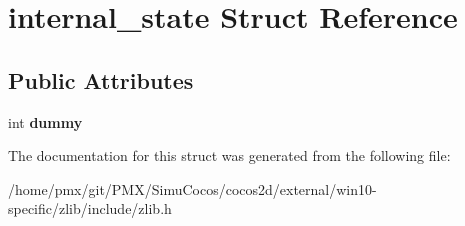 \hypertarget{structinternal__state}{}\section{internal\+\_\+state Struct Reference}
\label{structinternal__state}
\subsection*{Public Attributes}
\begin{DoxyCompactItemize}
\item 
\mbox{\label{structinternal__state_ab000a3e3c901dd063859521988ad7e52}} 
int {\bfseries dummy}
\end{DoxyCompactItemize}


The documentation for this struct was generated from the following file\+:\begin{DoxyCompactItemize}
\item 
/home/pmx/git/\+P\+M\+X/\+Simu\+Cocos/cocos2d/external/win10-\/specific/zlib/include/zlib.\+h\end{DoxyCompactItemize}
